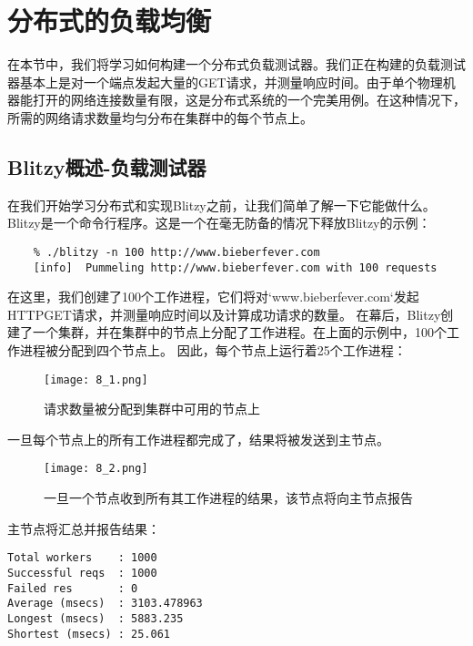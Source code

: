 \section{分布式的负载均衡}

在本节中，我们将学习如何构建一个分布式负载测试器。我们正在构建的负载测试器基本上是对一个端点发起大量的GET请求，并测量响应时间。由于单个物理机器能打开的网络连接数量有限，这是分布式系统的一个完美用例。在这种情况下，所需的网络请求数量均匀分布在集群中的每个节点上。

\subsection{Blitzy概述-负载测试器}

在我们开始学习分布式和实现Blitzy之前，让我们简单了解一下它能做什么。Blitzy是一个命令行程序。这是一个在毫无防备的情况下释放Blitzy的示例：
\begin{code}{}  \begin{verbatim}
    % ./blitzy -n 100 http://www.bieberfever.com
    [info]  Pummeling http://www.bieberfever.com with 100 requests
  \end{verbatim}
\end{code}

在这里，我们创建了100个工作进程，它们将对`www.bieberfever.com`发起HTTPGET请求，并测量响应时间以及计算成功请求的数量。
在幕后，Blitzy创建了一个集群，并在集群中的节点上分配了工作进程。在上面的示例中，100个工作进程被分配到四个节点上。
因此，每个节点上运行着25个工作进程：

\begin{figure}[!ht]
    \centering
    \texttt{[image: 8\_1.png]}
    \caption{请求数量被分配到集群中可用的节点上}
    \label{fig:8_1}
\end{figure}


一旦每个节点上的所有工作进程都完成了，结果将被发送到主节点。

\begin{figure}[!ht]
    \centering
    \texttt{[image: 8\_2.png]}
    \caption{一旦一个节点收到所有其工作进程的结果，该节点将向主节点报告}
    \label{fig:8_2}
\end{figure}

主节点将汇总并报告结果：

\begin{code}{}  \begin{verbatim}
Total workers    : 1000
Successful reqs  : 1000
Failed res       : 0 
Average (msecs)  : 3103.478963 
Longest (msecs)  : 5883.235
Shortest (msecs) : 25.061
\end{verbatim}
\end{code}


